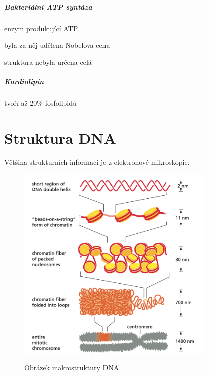 \documentclass[DIV=8]{scrreprt}
\begin{document}
\paragraph{Bakteriální ATP syntáza}
\begin{myItemize}[nosep]
    \item enzym produkující ATP
    \item byla za něj udělena Nobelova cena
    \item struktura nebyla určena celá
\end{myItemize}



\paragraph{Kardiolipin}
\begin{myItemize}[nosep]
    \item tvoří až 20\% fosfolipidů
\end{myItemize}



\chapter{Struktura DNA} \label{Struktura DNA}


Většina strukturních informací je z elektronové mikroskopie.

\begin{figure}
    \caption{Obrázek makrostruktury DNA}
    \includegraphics[width=0.85\textwidth]{dna_makrostructure.png}
    \centering
    \label{}
\end{figure}
\end{document}
